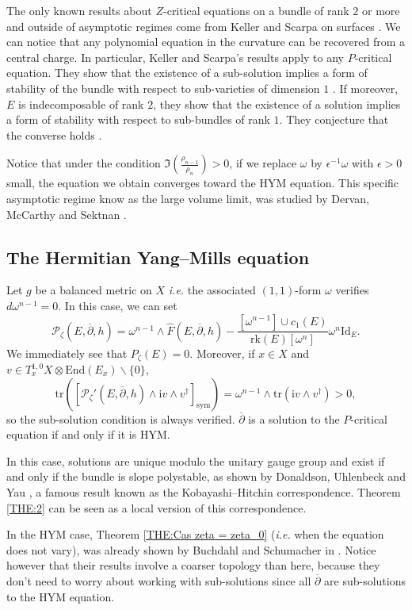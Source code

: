 \documentclass{article}
\theoremstyle{remark}
\theoremstyle{definition}
\newcommand{\rk}{\mathrm{rk}}
\newcommand{\End}{\mathrm{End}}
\newcommand{\tr}{\mathrm{tr}}
\newcommand{\Id}{\mathrm{Id}}
\renewcommand{\i}{\boldsymbol{\mathrm{i}}}
\newcommand{\mP}{\mathcal{P}}
\newcommand{\dbar}{\overline{\partial}}
\newcommand{\sym}{\mathrm{sym}}
\begin{document}
The only known results about $Z$-critical equations on a bundle of rank $2$ or more and outside of asymptotic regimes come from Keller and Scarpa on surfaces \cite[Theorem 1.1]{Keller_Scarpa}. We can notice that any polynomial equation in the curvature can be recovered from a central charge. In particular, Keller and Scarpa's results apply to any $P$-critical equation. They show that the existence of a sub-solution implies a form of stability of the bundle with respect to sub-varieties of dimension $1$ \cite[Definition 1.2]{Keller_Scarpa}. If moreover, $E$ is indecomposable of rank $2$, they show that the existence of a solution implies a form of stability with respect to sub-bundles of rank $1$. They conjecture that the converse holds \cite[Conjecture 1.4]{Keller_Scarpa}.

Notice that under the condition $\Im\left(\frac{\rho_{n - 1}}{\rho_n}\right) > 0$, if we replace $\omega$ by $\epsilon^{-1}\omega$ with $\epsilon > 0$ small, the equation we obtain converges toward the HYM equation. This specific asymptotic regime know as the large volume limit, was studied by Dervan, McCarthy and Sektnan \cite{DMS}.

\subsection{The Hermitian Yang--Mills equation}

Let $g$ be a balanced metric on $X$ \textit{i.e.} the associated $(1,1)$-form $\omega$ verifies $d\omega^{n - 1} = 0$. In this case, we can set
$$
\mP_\zeta(E,\dbar,h) = \omega^{n - 1} \wedge \hat{F}(E,\dbar,h) - \frac{[\omega^{n - 1}] \cup c_1(E)}{\rk(E)[\omega^n]}\omega^n\Id_E.
$$
We immediately see that $P_\zeta(E) = 0$. Moreover, if $x \in X$ and $v \in T_x^{1,0}X \otimes \End(E_x)\backslash\{0\}$,
$$
\tr([\mP_\zeta'(E,\dbar,h) \wedge \i v \wedge v^\dagger]_\sym) = \omega^{n - 1} \wedge \tr(\i v \wedge v^\dagger) > 0,
$$
so the sub-solution condition is always verified. $\dbar$ is a solution to the $P$-critical equation if and only if it is HYM.

In this case, solutions are unique modulo the unitary gauge group and exist if and only if the bundle is slope polystable, as shown by Donaldson, Uhlenbeck and Yau \cite{Donaldson,Uhlenbeck_Yau,Lübke_Teleman}, a famous result known as the Kobayashi--Hitchin correspondence. Theorem \ref{THE:2} can be seen as a local version of this correspondence.

In the HYM case, Theorem \ref{THE:Cas zeta = zeta_0} (\textit{i.e.} when the equation does not vary), was already shown by Buchdahl and Schumacher in \cite{Buchdahl_Schumacher}. Notice however that their results involve a coarser topology than here, because they don't need to worry about working with sub-solutions since all $\dbar$ are sub-solutions to the HYM equation.
\end{document}
